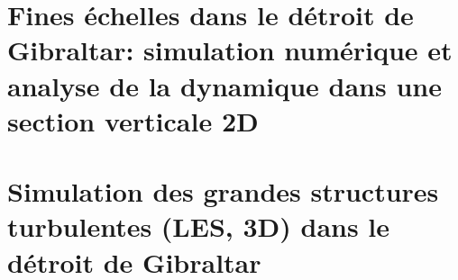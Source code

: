 \documentclass[a4paper,12pt,notitlepage,twoside]{report}
\numberwithin{equation}{section}
\begin{document}
 
\chapter[Fines échelles dans le détroit de Gibraltar: section verticale 2D]{Fines échelles dans le détroit de Gibraltar: simulation numérique et analyse de la dynamique dans une section verticale 2D}
\label{chapGBR2D}


%



\chapter{Simulation des grandes structures turbulentes (LES, 3D) dans le détroit de Gibraltar}
\label{chapGBR3D}
 





\newpage
 \null
\end{document}
